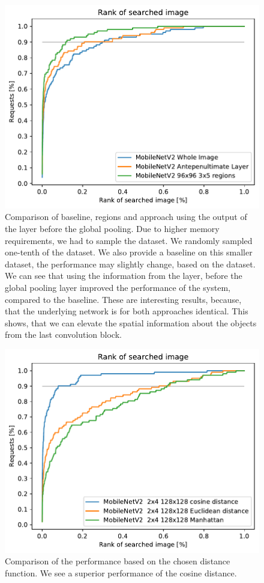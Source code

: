 \begin{figure}
    \centering
    \includegraphics[width=0.8\linewidth]{graphs/adaf8d435bb40406f9ce40654ec396e04453ab76cf0776d2a87d385055d5424f.pdf}
    \caption{Comparison of baseline, regions and approach using the output of the layer before the global pooling. Due to higher memory requirements, we had to sample the dataset. We randomly sampled one-tenth of the dataset. We also provide a baseline on this smaller dataset, the performance may slightly change, based on the dataset. We can see that using the information from the layer, before the global pooling layer improved the performance of the system, compared to the baseline. These are interesting results, because, that the underlying network is for both approaches identical. This shows, that we can elevate the spatial information about the objects from the last convolution block.}
    \label{fig:antepenultimate}
\end{figure}

\begin{figure}
    \centering
    \includegraphics[width=0.8\linewidth]{graphs/3aab502ea602a9f49afaa0a0d998cf226a0a67b9efcaa655d2ddf5063eeabe47.pdf}
    \caption{Comparison of the performance based on the chosen distance function. We see a superior performance of the cosine distance.}
    \label{fig:regions_distances}
\end{figure}

